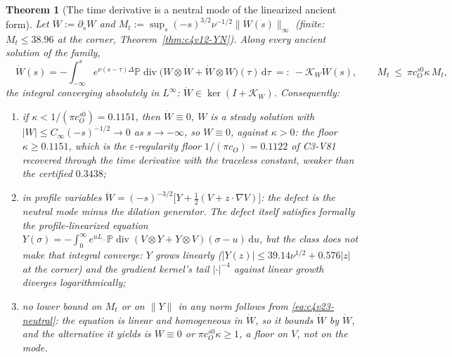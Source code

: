 \documentclass[11pt]{article}
\newcommand{\dd}{\,\mathrm d}
\newcommand{\PP}{\mathbb P}
\theoremstyle{plain}
\newtheorem{theorem}{Theorem}[section]
\theoremstyle{definition}
\theoremstyle{remark}
\begin{document}
\begin{theorem}[The time derivative is a neutral mode of the linearized ancient form]
\label{thm:c4v23-neutral}
Let \(\dot W:=\partial_sW\) and \(M_t:=\sup_s(-s)^{3/2}\nu^{-1/2}\|\dot W(s)\|_\infty\) (finite: \(M_t\le38.96\) at the
corner, Theorem~\ref{thm:c4v12-YN}).  Along every ancient solution of
the family,
\begin{equation}
 \boxed{\quad
 \dot W(s)=-\int_{-\infty}^se^{\nu(s-\tau)\Delta}\PP\operatorname{div}\bigl(W\otimes\dot W+\dot W\otimes W\bigr)(\tau)\dd\tau
 \ =:\ -\mathcal K_W\dot W(s),
 \qquad M_t\ \le\ \pi c_O^{s0}\kappa\,M_t ,
 \quad}
 \label{eq:c4v23-neutral}
\end{equation}
the integral converging absolutely in \(L^\infty\): \(\dot W\in\ker(I+\mathcal K_W)\).  Consequently:
\begin{enumerate}[label=\textup{(\roman*)},leftmargin=3.2em]
\item if \(\kappa<1/(\pi c_O^{s0})=0.1151\), then \(\dot W\equiv0\), \(W\) is a steady solution with
      \(|W|\le C_\infty(-s)^{-1/2}\to0\) as \(s\to-\infty\), so \(W\equiv0\), against \(\kappa>0\): the floor
      \(\kappa\ge0.1151\), which is the \(\varepsilon\)-regularity floor \(1/(\pi c_O)=0.1122\) of C3-V81
      recovered through the time derivative with the traceless
      constant, weaker than the certified \(0.3438\);
\item in profile variables \(\dot W=(-s)^{-3/2}\bigl[Y+\frac12(V+z\cdot\nabla V)\bigr]\): the defect is
      the neutral mode minus the dilation generator.  The defect
      itself satisfies formally the profile-linearized equation
      \(Y(\sigma)=-\int_0^\infty e^{uL_-}\PP\operatorname{div}(V\otimes Y+Y\otimes V)(\sigma-u)\dd u\), but the class does not make
      that integral converge: \(Y\) grows linearly (\(|Y(z)|\le39.14\nu^{1/2}+0.576|z|\) at
      the corner) and the gradient kernel's tail \(|\cdot|^{-4}\) against linear
      growth diverges logarithmically;
\item no lower bound on \(M_t\) or on \(\|Y\|\) in any norm follows from
      \eqref{eq:c4v23-neutral}: the equation is linear and homogeneous in
      \(\dot W\), so it bounds \(\dot W\) by \(\dot W\), and the alternative it yields is
      \(\dot W\equiv0\) or \(\pi c_O^{s0}\kappa\ge1\), a floor on \(V\), not on the mode.
\end{enumerate}
\end{theorem}
\end{document}

